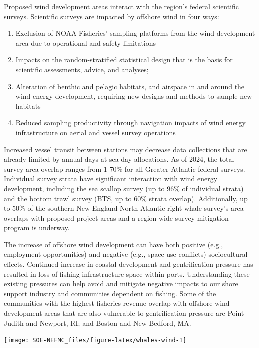 \documentclass[
  10pt,
]{article}
\providecommand{\tightlist}{%
  \setlength{\itemsep}{0pt}\setlength{\parskip}{0pt}}
\let\origfigure\figure
\let\endorigfigure\endfigure
\renewenvironment{figure}[1][2] {
    \expandafter\origfigure\expandafter[H]
} {
    \endorigfigure
}
\begin{document}
Proposed wind development areas interact with the region's federal scientific surveys. Scientific surveys are impacted by offshore wind in four ways:

\begin{enumerate}
\def\labelenumi{\arabic{enumi}.}
\tightlist
\item
  Exclusion of NOAA Fisheries' sampling platforms from the wind development area due to operational and safety limitations
\item
  Impacts on the random-stratified statistical design that is the basis for scientific assessments, advice, and analyses;
\item
  Alteration of benthic and pelagic habitats, and airspace in and around the wind energy development, requiring new designs and methods to sample new habitats
\item
  Reduced sampling productivity through navigation impacts of wind energy infrastructure on aerial and vessel survey operations
\end{enumerate}

Increased vessel transit between stations may decrease data collections that are already limited by annual days-at-sea day allocations. As of 2024, the total survey area overlap ranges from 1-70\% for all Greater Atlantic federal surveys. Individual survey strata have significant interaction with wind energy development, including the sea scallop survey (up to 96\% of individual strata) and the bottom trawl survey (BTS, up to 60\% strata overlap). Additionally, up to 50\% of the southern New England North Atlantic right whale survey's area overlaps with proposed project areas and a region-wide survey mitigation program is underway.

The increase of offshore wind development can have both positive (e.g., employment opportunities) and negative (e.g., space-use conflicts) sociocultural effects. Continued increase in coastal development and gentrification pressure has resulted in loss of fishing infrastructure space within ports. Understanding these existing pressures can help avoid and mitigate negative impacts to our shore support industry and communities dependent on fishing. Some of the communities with the highest fisheries revenue overlap with offshore wind development areas that are also vulnerable to gentrification pressure are Point Judith and Newport, RI; and Boston and New Bedford, MA.

\begin{figure}

{\centering \texttt{[image: SOE-NEFMC\_files/figure-latex/whales-wind-1]} 

}

\caption{Northern Right Whale persistent hotspots and Wind Energy Areas. Areas outlined in black show active or proposed wind energy leases.}\label{fig:whales-wind}
\end{figure}
\newpage
\end{document}
